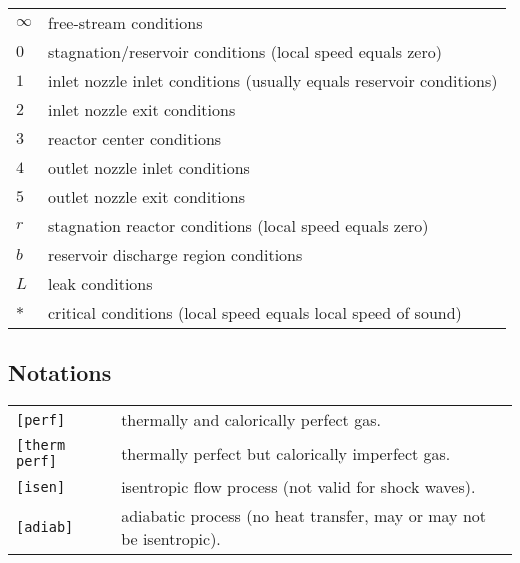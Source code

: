 \begin{flushleft}
\renewcommand{\arraystretch}{1.3}
\begin{tabular}{ll}
$\infty$ & free-stream conditions \\
$0$ & stagnation/reservoir conditions (local speed equals zero) \\
$1$ & inlet nozzle inlet conditions (usually equals reservoir conditions) \\
$2$ & inlet nozzle exit conditions \\
$3$ & reactor center conditions \\
$4$ & outlet nozzle inlet conditions \\
$5$ & outlet nozzle exit conditions \\
$r$ & stagnation reactor conditions (local speed equals zero) \\
$b$ & reservoir discharge region conditions \\
$L$ & leak conditions \\
$*$ & critical conditions (local speed equals local speed of sound) \\
\end{tabular}
\end{flushleft}

\subsection*{Notations}

\begin{flushleft}
\renewcommand{\arraystretch}{1.3}
\begin{tabular}{ll}
    \texttt{[perf]} & thermally and calorically perfect gas. \\
    \texttt{[therm perf]} & thermally perfect but calorically imperfect gas.\\
    \texttt{[isen]} & isentropic flow process (not valid for shock waves).\\
    \texttt{[adiab]} & adiabatic process (no heat transfer, may or may not be isentropic).\\
\end{tabular}
\end{flushleft}
